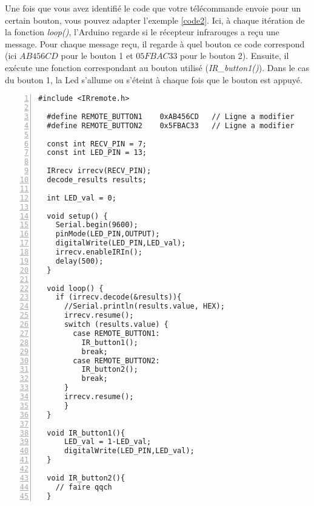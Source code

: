 Une fois que vous avez identifié le code que votre télécommande envoie pour un certain bouton, vous pouvez adapter l’exemple \autoref{code2}.
Ici, à chaque itération de la fonction \textit{loop()}, l'Arduino regarde si le récepteur infrarouges a reçu une message. Pour chaque message reçu, il regarde à quel bouton ce code correspond (ici $AB456CD$ pour le bouton 1 et $05FBAC33$ pour le bouton 2). Ensuite, il exécute une fonction correspondant au bouton utilisé (\textit{IR\_button1()}).
Dans le cas du bouton 1, la Led s'allume ou s'éteint à chaque fois que le bouton est appuyé.

\lstset{language=C}
\begin{lstlisting}[frame=single,numbers=left,numberstyle=\small,label={code2},caption={Code 2}]
  #include <IRremote.h>

  #define REMOTE_BUTTON1    0xAB456CD   // Ligne a modifier
  #define REMOTE_BUTTON2    0x5FBAC33   // Ligne a modifier

  const int RECV_PIN = 7;
  const int LED_PIN = 13;

  IRrecv irrecv(RECV_PIN);
  decode_results results;

  int LED_val = 0;

  void setup() {
    Serial.begin(9600);
    pinMode(LED_PIN,OUTPUT);
    digitalWrite(LED_PIN,LED_val);
    irrecv.enableIRIn();
    delay(500);
  }

  void loop() {
    if (irrecv.decode(&results)){
      //Serial.println(results.value, HEX);
      irrecv.resume();
      switch (results.value) {
        case REMOTE_BUTTON1:
          IR_button1();
          break;
        case REMOTE_BUTTON2:
          IR_button2();
          break;
      }
      irrecv.resume();
      }
  }

  void IR_button1(){
      LED_val = 1-LED_val;
      digitalWrite(LED_PIN,LED_val);
  }

  void IR_button2(){
    // faire qqch
  }
\end{lstlisting}

